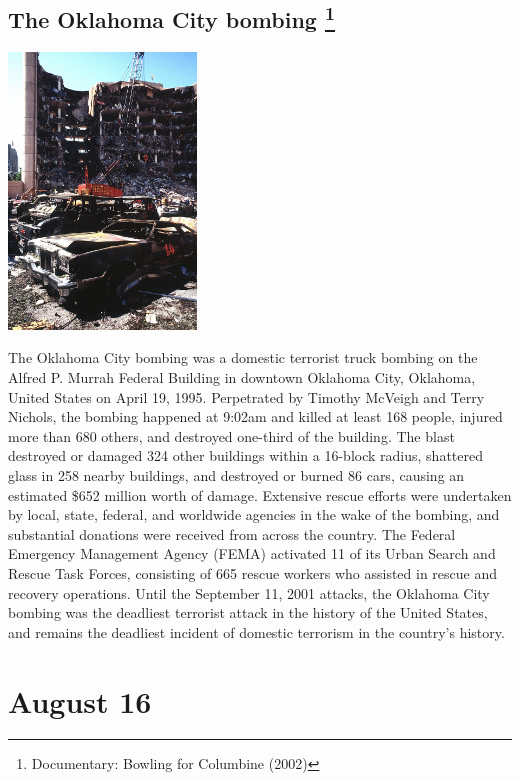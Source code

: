 \documentclass[11pt]{report}
\begin{document}
\subsection{The Oklahoma City bombing \protect\footnote{Documentary: Bowling for Columbine (2002)}}
\vspace{2mm}\begin{center}\includegraphics[width=5cm]{./img/oklahomaBombing.jpg}\end{center}
The Oklahoma City bombing was a domestic terrorist truck bombing on the Alfred P. Murrah Federal Building in downtown Oklahoma City, Oklahoma, United States on April 19, 1995. Perpetrated by Timothy McVeigh and Terry Nichols, the bombing happened at 9:02am and killed at least 168 people, injured more than 680 others, and destroyed one-third of the building. The blast destroyed or damaged 324 other buildings within a 16-block radius, shattered glass in 258 nearby buildings, and destroyed or burned 86 cars, causing an estimated \$652 million worth of damage. Extensive rescue efforts were undertaken by local, state, federal, and worldwide agencies in the wake of the bombing, and substantial donations were received from across the country. The Federal Emergency Management Agency (FEMA) activated 11 of its Urban Search and Rescue Task Forces, consisting of 665 rescue workers who assisted in rescue and recovery operations. Until the September 11, 2001 attacks, the Oklahoma City bombing was the deadliest terrorist attack in the history of the United States, and remains the deadliest incident of domestic terrorism in the country's history.
\section{August 16}
\end{document}
